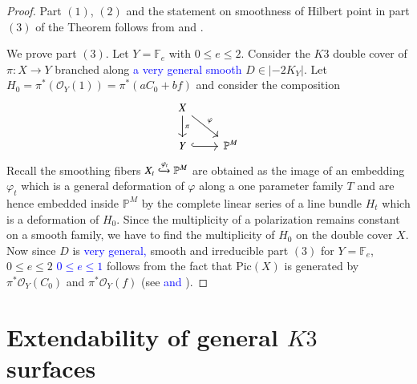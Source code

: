\documentclass[11pt,twoside]{amsart}
\theoremstyle{plain}
\numberwithin{equation}{section}
\theoremstyle{definition}
\begin{document}
\begin{proof} Part $(1)$, $(2)$ and the statement on smoothness of Hilbert point in part $(3)$ of the Theorem follows from \cite[Theorem $3.1 (3)$, Theorem $4.3$, Theorem $5.1$]{BMR21} and \cite[Proposition $1.7$, Theorem $3.5$, Theorem $4.1$]{GP97}.
    

We prove part $(3)$. Let $Y = \mathbb{F}_e$ with $0 \leq e \leq 2$. Consider the $K3$ double cover of $\pi:X \to Y$ branched along \textcolor{blue}{a very general smooth} $D \in |-2K_Y|$. Let $H_0 = \pi^*(\mathcal{O}_{Y}(1)) = \pi^*(aC_0+bf)$ and consider the composition  
\[
\begin{tikzcd}
X \arrow[dr, "\varphi"] \arrow[d, "\pi"] & \\
Y \arrow[r, hook] & \mathbb{P}^M
\end{tikzcd}
\]
Recall the smoothing fibers $X_t \xhookrightarrow{\varphi_t} \mathbb{P}^M$ are obtained as the image of an embedding $\varphi_t$ which is a general deformation of $\varphi$ along a one parameter family $T$ and are hence embedded inside $\mathbb{P}^M$ by the complete linear series of a line bundle $H_t$ which is a deformation of $H_0$. Since the multiplicity of a polarization remains constant on a smooth family, we have to find the multiplicity of $H_0$ on the double cover $X$. Now since $D$ is \textcolor{blue}{very general,} smooth and irreducible part $(3)$ for $Y = \mathbb{F}_e$, \sout{$0 \leq e \leq 2$} \textcolor{blue}{$0 \leq e \leq 1$} follows from the fact that $\textrm{Pic}(X)$ is generated by $\pi^*\mathcal{O}_Y(C_0)$ and $\pi^*\mathcal{O}_Y(f)$ (see \cite[Proposition $6.3$]{AHL10} \textcolor{blue}{and \cite[Proposition $6.5$ (i), (iii)]{AHL10}}).

\end{proof}

\section{Extendability of general $K3$ surfaces}
\end{document}
